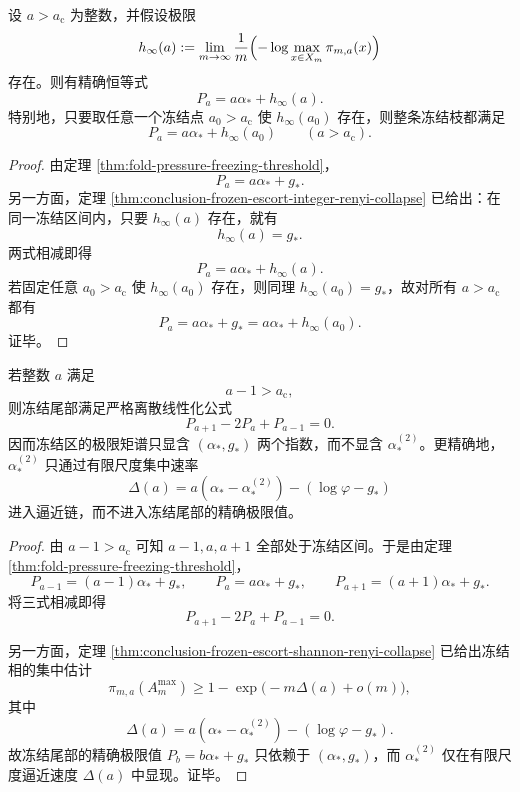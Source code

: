 \begin{theorem}[冻结枝的零温互逆公式]\label{thm:conclusion-frozen-branch-zero-temperature-reciprocity}
设 \(a>a_{\mathrm c}\) 为整数，并假设极限
\[
h_\infty(a):=
\lim_{m\to\infty}\frac1m\Bigl(-\log\max_{x\in X_m}\pi_{m,a}(x)\Bigr)
\]
存在。则有精确恒等式
\[
P_a=a\alpha_\ast+h_\infty(a).
\]
特别地，只要取任意一个冻结点 \(a_0>a_{\mathrm c}\) 使 \(h_\infty(a_0)\) 存在，则整条冻结枝都满足
\[
P_a=a\alpha_\ast+h_\infty(a_0)
\qquad (a>a_{\mathrm c}).
\]
\end{theorem}

\begin{proof}
由定理 \ref{thm:fold-pressure-freezing-threshold}，
\[
P_a=a\alpha_\ast+g_\ast.
\]
另一方面，定理 \ref{thm:conclusion-frozen-escort-integer-renyi-collapse} 已给出：在同一冻结区间内，只要 \(h_\infty(a)\) 存在，就有
\[
h_\infty(a)=g_\ast.
\]
两式相减即得
\[
P_a=a\alpha_\ast+h_\infty(a).
\]
若固定任意 \(a_0>a_{\mathrm c}\) 使 \(h_\infty(a_0)\) 存在，则同理 \(h_\infty(a_0)=g_\ast\)，故对所有 \(a>a_{\mathrm c}\) 都有
\[
P_a=a\alpha_\ast+g_\ast=a\alpha_\ast+h_\infty(a_0).
\]
证毕。
\end{proof}

\begin{theorem}[冻结尾部的零曲率与次大纤维指数的逼近可见性]\label{thm:conclusion-frozen-tail-zero-curvature-second-maximum-visibility}
若整数 \(a\) 满足
\[
a-1>a_{\mathrm c},
\]
则冻结尾部满足严格离散线性化公式
\[
P_{a+1}-2P_a+P_{a-1}=0.
\]
因而冻结区的极限矩谱只显含 \((\alpha_\ast,g_\ast)\) 两个指数，而不显含 \(\alpha_\ast^{(2)}\)。更精确地，\(\alpha_\ast^{(2)}\) 只通过有限尺度集中速率
\[
\Delta(a)=a(\alpha_\ast-\alpha_\ast^{(2)})-(\log\varphi-g_\ast)
\]
进入逼近链，而不进入冻结尾部的精确极限值。
\end{theorem}

\begin{proof}
由 \(a-1>a_{\mathrm c}\) 可知 \(a-1,a,a+1\) 全部处于冻结区间。于是由定理 \ref{thm:fold-pressure-freezing-threshold}，
\[
P_{a-1}=(a-1)\alpha_\ast+g_\ast,
\qquad
P_a=a\alpha_\ast+g_\ast,
\qquad
P_{a+1}=(a+1)\alpha_\ast+g_\ast.
\]
将三式相减即得
\[
P_{a+1}-2P_a+P_{a-1}=0.
\]

另一方面，定理 \ref{thm:conclusion-frozen-escort-shannon-renyi-collapse} 已给出冻结相的集中估计
\[
\pi_{m,a}(A_m^{\max})
\ge
1-\exp\!\bigl(-m\Delta(a)+o(m)\bigr),
\]
其中
\[
\Delta(a)=a(\alpha_\ast-\alpha_\ast^{(2)})-(\log\varphi-g_\ast).
\]
故冻结尾部的精确极限值 \(P_b=b\alpha_\ast+g_\ast\) 只依赖于 \((\alpha_\ast,g_\ast)\)，而 \(\alpha_\ast^{(2)}\) 仅在有限尺度逼近速度 \(\Delta(a)\) 中显现。证毕。
\end{proof}


